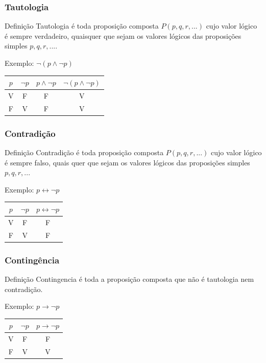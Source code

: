 \documentclass[aspectratio=169]{beamer} %
\begin{document}
\begin{frame}
\frametitle{Tautologia}

\begin{block}{Definição}
Tautologia é toda proposição composta $P(p, q,r, . . .)$ cujo valor lógico é sempre verdadeiro, quaisquer que sejam os valores lógicos das proposições
simples $p, q,r, . . .$.
\end{block}\vfill

\begin{exampleblock}{Exemplo: $\neg (p \wedge \neg p)$}
	\center
	\begin{tabular}{|c|c|c|c|}
		\hline
		$p$ & $\neg p$ &  $p \wedge \neg p$ & $\neg (p \wedge \neg p)$\\ \hline
		V & F  & F & V \\ \hline
		F & V  & F & V \\ \hline
	\end{tabular}
\end{exampleblock}
\end{frame}

\begin{frame}
\frametitle{Contradição}

\begin{block}{Definição}
Contradição é toda proposição composta $P(p, q,r, . . .)$ cujo valor lógico é sempre falso, quais quer que sejam os valores lógicos das proposições simples $p, q,r, . . .$
\end{block}\vfill

\begin{exampleblock}{Exemplo: $p \leftrightarrow \neg p$}
	\center
	\begin{tabular}{|c|c|c|}
		\hline
		$p$ & $\neg p$ &  $p \leftrightarrow \neg p$\\ \hline
		V & F  & F \\ \hline
		F & V  & F \\ \hline
	\end{tabular}
\end{exampleblock}
\end{frame}

\begin{frame}
\frametitle{Contingência}

\begin{block}{Definição}
Contingencia é toda a proposição composta que não é tautologia nem contradição.
\end{block}\vfill

\begin{exampleblock}{Exemplo: $p \rightarrow \neg p$}
	\center
	\begin{tabular}{|c|c|c|}
		\hline
		$p$ & $\neg p$ &  $p \rightarrow \neg p$\\ \hline
		V & F  & F \\ \hline
		F & V  & V \\ \hline
	\end{tabular}
\end{exampleblock}
\end{frame}
\end{document}
